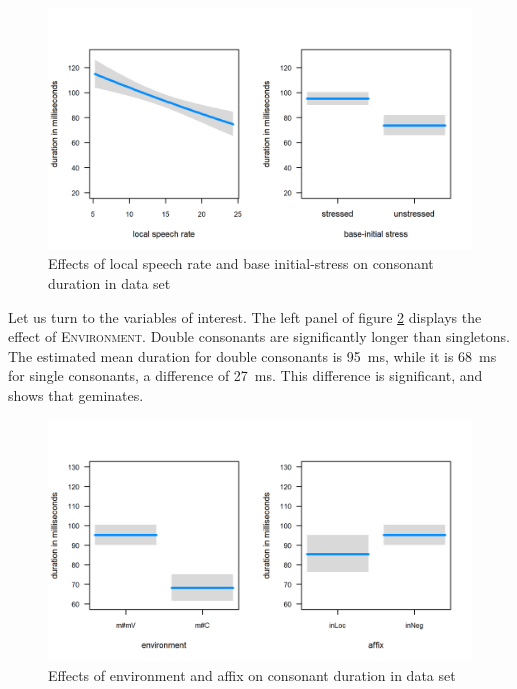 \begin{figure} [b!]
	\centering
	\vspace*{-0.7cm}
	\includegraphics  [scale=0.8] {images/Corpus/inModelcov.png}
	\caption{Effects of local speech rate and base initial-stress on consonant duration in data set}
	\label{fig:covariates in}
\end{figure}

Let us turn to the variables of interest. The left panel of figure \ref{fig:inModel} displays the effect of \textsc{Environment}. Double consonants are significantly longer than singletons. The estimated mean duration for double consonants is 95~ms, while it is 68~ms for single consonants, a difference of 27~ms. This difference is significant, and shows that  geminates. 







\begin{figure} [t!]
	\centering
	\includegraphics [scale=0.8]  {images/Corpus/inModel.png}
	\caption{Effects of environment and affix on consonant duration in data set}
	\label{fig:inModel}
\end{figure}



